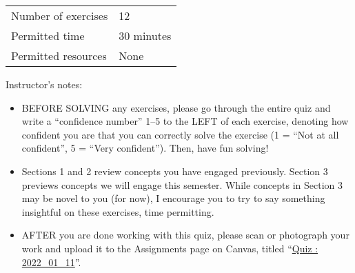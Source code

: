 \begin{center}
\begin{tabular}{l@{ : }l}
Number of exercises	&	12			\\
Permitted time		&	30 minutes	\\
Permitted resources	&	None
\end{tabular}
\end{center}
\vspace{.25in}
\noindent{}Instructor's notes:
\begin{itemize}
\item BEFORE SOLVING any exercises, please go through the entire quiz and write a ``confidence number'' 1--5 to the LEFT of each exercise, denoting how confident you are that you can correctly solve the exercise (1 = ``Not at all confident'', 5 = ``Very confident''). Then, have fun solving!

\item Sections 1 and 2 review concepts you have engaged previously. Section 3 previews concepts we will engage this semester. While concepts in Section 3 may be novel to you (for now), I encourage you to try to say something insightful on these exercises, time permitting.

\item AFTER you are done working with this quiz, please scan or photograph your work and upload it to the Assignments page on Canvas, titled ``\href{https://canvas.rice.edu/courses/48326/assignments/236486}{Quiz : 2022\_01\_11}''.
\end{itemize}